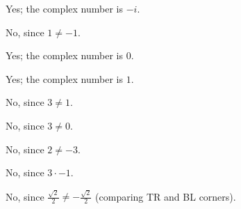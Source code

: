 \documentclass[../key.tex]{subfiles}
\begin{document}
Yes; the complex number is $-i$.

\begin{iinner_problem}
\item {}
\end{iinner_problem}

No, since $1\neq -1$.

\begin{iinner_problem}
\item {}
\end{iinner_problem}

Yes; the complex number is $0$.

\begin{iinner_problem}
\item {}
\end{iinner_problem}

Yes; the complex number is $1$.

\begin{iinner_problem}
\item {}
\end{iinner_problem}

No, since $3\neq 1$.

\begin{iinner_problem}
\item {}
\end{iinner_problem}

No, since $3\neq 0$.

\begin{iinner_problem}
\item {}
\end{iinner_problem}

No, since $2\neq -3$.

\begin{iinner_problem}
\item {}
\end{iinner_problem}

No, since $3\cdot -1$.

\begin{iinner_problem}
\item {}
\end{iinner_problem}

No, since $\frac{\sqrt{2}}{2} \neq -\frac{\sqrt{2}}{2}$ (comparing TR and BL corners).

\begin{iinner_problem}
\item {}
\end{iinner_problem}
\end{document}
